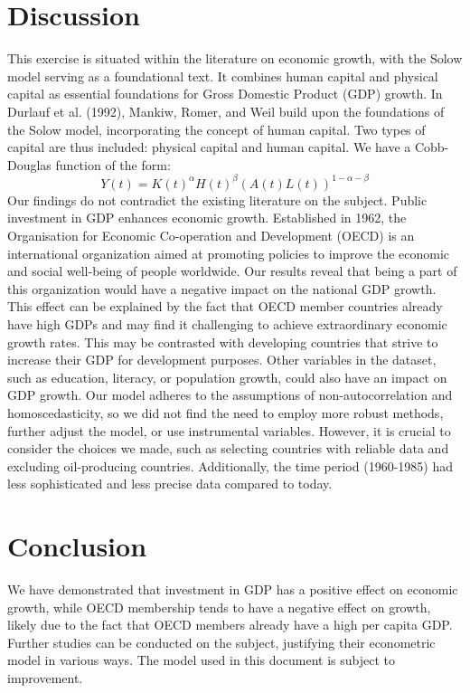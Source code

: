 \documentclass[12pt,fleqn]{report}
\begin{document}
\section*{Discussion}
This exercise is situated within the literature on economic growth, with the Solow model serving as a foundational text. It combines human capital and physical capital as essential foundations for Gross Domestic Product (GDP) growth. In Durlauf et al. (1992), Mankiw, Romer, and Weil build upon the foundations of the Solow model, incorporating the concept of human capital. Two types of capital are thus included: physical capital and human capital.
We have a Cobb-Douglas function of the form: 
\[Y(t) = K(t)^{\alpha} H(t)^{\beta} (A(t)L(t))^{1-\alpha-\beta}\]
Our findings do not contradict the existing literature on the subject. Public investment in GDP enhances economic growth. Established in 1962, the Organisation for Economic Co-operation and Development (OECD) is an international organization aimed at promoting policies to improve the economic and social well-being of people worldwide. Our results reveal that being a part of this organization would have a negative impact on the national GDP growth. This effect can be explained by the fact that OECD member countries already have high GDPs and may find it challenging to achieve extraordinary economic growth rates. This may be contrasted with developing countries that strive to increase their GDP for development purposes.
Other variables in the dataset, such as education, literacy, or population growth, could also have an impact on GDP growth. Our model adheres to the assumptions of non-autocorrelation and homoscedasticity, so we did not find the need to employ more robust methods, further adjust the model, or use instrumental variables. However, it is crucial to consider the choices we made, such as selecting countries with reliable data and excluding oil-producing countries. Additionally, the time period (1960-1985) had less sophisticated and less precise data compared to today.\\

\section*{Conclusion}
We have demonstrated that investment in GDP has a positive effect on economic growth, while OECD membership tends to have a negative effect on growth, likely due to the fact that OECD members already have a high per capita GDP. Further studies can be conducted on the subject, justifying their econometric model in various ways. The model used in this document is subject to improvement.\\
\end{document}
